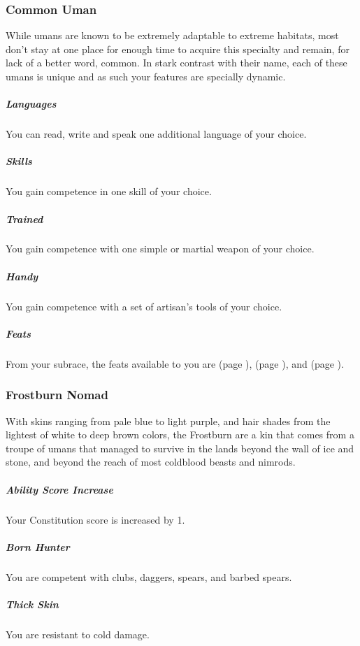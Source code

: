 \subsubsection{Common Uman}
    While umans are known to be extremely adaptable to extreme habitats, most don't stay at one place for enough time to acquire this specialty and remain, for lack of a better word, common.
    In stark contrast with their name, each of these umans is unique and as such your features are specially dynamic.

    \subparagraph{Languages} You can read, write and speak one additional language of your choice.

    \subparagraph{Skills} You gain competence in one skill of your choice.

    \subparagraph{Trained} You gain competence with one simple or martial weapon of your choice.

    \subparagraph{Handy} You gain competence with a set of artisan's tools of your choice.


    \subparagraph{Feats} From your subrace, the feats available to you are
    \textbf{} (page \pageref{feat::}),
    \textbf{} (page \pageref{feat::}), and
    \textbf{} (page \pageref{feat::}).

\subsubsection{Frostburn Nomad}
    With skins ranging from pale blue to light purple, and hair shades from the lightest of white to deep brown colors, the Frostburn are a kin that comes from a troupe of umans that managed to survive in the lands beyond the wall of ice and stone, and beyond the reach of most coldblood beasts and nimrods.

    \subparagraph{Ability Score Increase} Your Constitution score is increased by 1.


    \subparagraph{Born Hunter} You are competent with clubs, daggers, spears, and barbed spears.

    \subparagraph{Thick Skin} %
    You are resistant to cold damage.%

